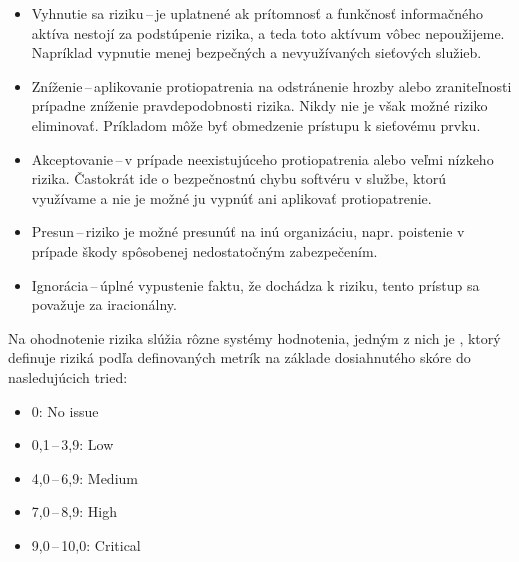 \begin{itemize}
	\item Vyhnutie sa riziku\,--\,je uplatnené ak prítomnosť a funkčnosť informačného aktíva nestojí za podstúpenie rizika, a teda toto aktívum vôbec nepoužijeme. Napríklad vypnutie menej bezpečných a nevyužívaných sieťových služieb.  
	
	\item Zníženie\,--\,aplikovanie protiopatrenia na odstránenie hrozby alebo zraniteľnosti prípadne zníženie pravdepodobnosti rizika. Nikdy nie je však možné riziko eliminovať. Príkladom môže byť obmedzenie prístupu k sieťovému prvku.
	
	\item Akceptovanie\,--\,v prípade neexistujúceho protiopatrenia alebo veľmi nízkeho rizika. Častokrát ide o bezpečnostnú chybu softvéru v službe, ktorú využívame a nie je možné ju vypnúť ani aplikovať protiopatrenie.
	
	\item Presun\,--\,riziko je možné presunúť na inú organizáciu, napr. poistenie v prípade škody spôsobenej nedostatočným zabezpečením.
	
	\item Ignorácia\,--\,úplné vypustenie faktu, že dochádza k riziku, tento prístup sa považuje za iracionálny.
\end{itemize}
\vspace{2em}
\noindent
Na ohodnotenie rizika slúžia rôzne systémy hodnotenia, jedným z nich je  , ktorý definuje riziká podľa definovaných metrík na základe dosiahnutého skóre do nasledujúcich tried:

\begin{itemize}
	\item 0: No issue
	\item 0,1\,--\,3,9: Low
	\item 4,0\,--\,6,9: Medium
	\item 7,0\,--\,8,9: High
	\item 9,0\,--\,10,0: Critical
\end{itemize} 
